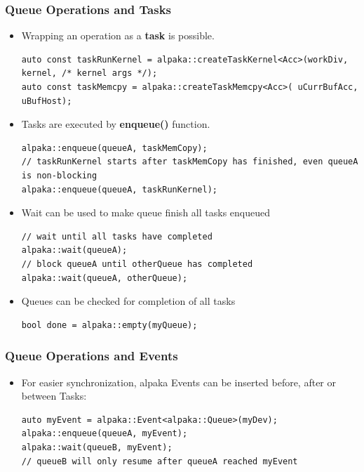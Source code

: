 \documentclass[9pt]{beamer}
\begin{document}
\begin{frame}[fragile]
\frametitle{Queue Operations and Tasks}
\begin{itemize}
\item Wrapping an operation as a \textbf{task} is possible.
\begin{lstlisting}
auto const taskRunKernel = alpaka::createTaskKernel<Acc>(workDiv, kernel, /* kernel args */);
auto const taskMemcpy = alpaka::createTaskMemcpy<Acc>( uCurrBufAcc, uBufHost);
\end{lstlisting}
\item Tasks are executed by \textbf{enqueue()} function.
\begin{lstlisting}
alpaka::enqueue(queueA, taskMemCopy);
// taskRunKernel starts after taskMemCopy has finished, even queueA is non-blocking
alpaka::enqueue(queueA, taskRunKernel);
\end{lstlisting}
\item Wait can be used to make queue finish all tasks enqueued
\begin{lstlisting}
// wait until all tasks have completed
alpaka::wait(queueA);
// block queueA until otherQueue has completed
alpaka::wait(queueA, otherQueue);
\end{lstlisting}
\item Queues can be checked for completion of all tasks
\begin{lstlisting}
bool done = alpaka::empty(myQueue);
\end{lstlisting}
\end{itemize}
\end{frame}

\begin{frame}[fragile]
\frametitle{Queue Operations and Events}

\begin{itemize}
\item For easier synchronization, alpaka Events can be inserted before, after or between Tasks:
\begin{lstlisting}
auto myEvent = alpaka::Event<alpaka::Queue>(myDev);
alpaka::enqueue(queueA, myEvent);
alpaka::wait(queueB, myEvent);
// queueB will only resume after queueA reached myEvent
\end{lstlisting}
\end{itemize}
\end{frame}
\end{document}
